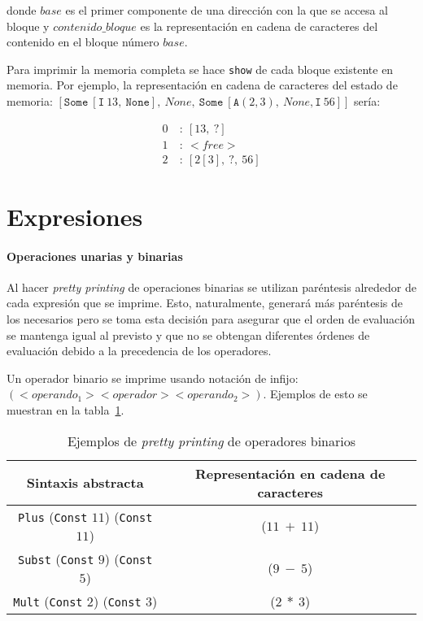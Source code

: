 donde $base$ es el primer componente de una dirección con la que se accesa al bloque y $contenido\_bloque$ es la representación en cadena de caracteres del contenido en el bloque número $base$.

Para imprimir la memoria completa se hace \verb|show| de cada bloque existente en memoria.
Por ejemplo, la representación en cadena de caracteres del estado de memoria: $[\mathtt{Some}\ [\mathtt{I}\ 13,\ \mathtt{None}],\ None,\ \mathtt{Some}\ [\mathtt{A}(2,3),\ None, \mathtt{I}\ 56]]$ sería:

\begin{align*}
0\ &:\ [13,\ ?] \\
1\ &:\ <free> \\
2\ &:\ [2[3],\ ?,\ 56]
\end{align*}

\section{Expresiones}

\paragraph*{Operaciones unarias y binarias}
Al hacer \textit{pretty printing} de operaciones binarias se utilizan paréntesis alrededor de cada expresión que se imprime.
Esto, naturalmente, generará más paréntesis de los necesarios pero se toma esta decisión para asegurar que el orden de evaluación se mantenga igual al previsto y que no se obtengan diferentes órdenes de evaluación debido a la precedencia de los operadores.

Un operador binario se imprime usando notación de infijo: $(<operando_1> <operador> <operando_2>)$.
Ejemplos de esto se muestran en la tabla~\ref{tab:pretty_bin_op}.

\begin{table}[h!]
\centering
\begin{tabular}{|c|c|}
  \hline
  \textbf{Sintaxis abstracta} & \textbf{Representación en cadena de caracteres} \\ [0.5ex]
  \hline \hline
  \verb|Plus| (\verb|Const| $11$) (\verb|Const| $11$) & ($11\ +\ 11$) \\
  \verb|Subst| (\verb|Const| $9$) (\verb|Const| $5$) & ($9\ -\ 5$) \\
  \verb|Mult| (\verb|Const| $2$) (\verb|Const| $3$) & ($2\ *\ 3$) \\
  \hline
\end{tabular}

\caption{Ejemplos de \textit{pretty printing} de operadores binarios}
\label{tab:pretty_bin_op}
\end{table}

